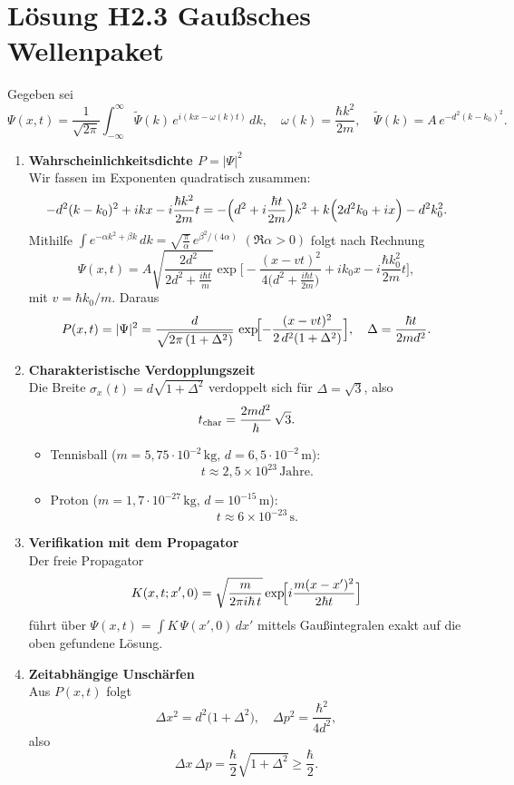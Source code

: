 \documentclass[a4paper,12pt]{article}
\begin{document}
\section*{Lösung H2.3 Gaußsches Wellenpaket}

Gegeben sei
\[
\Psi(x,t)
=\frac{1}{\sqrt{2\pi}}
\int_{-\infty}^{\infty}
\tilde\Psi(k)\,e^{i(kx-\omega(k)t)}\,dk,
\quad
\omega(k)=\frac{\hbar k^2}{2m},
\quad
\tilde\Psi(k)=A\,e^{-d^2(k-k_0)^2}.
\]

\begin{enumerate}[label=(\alph*)]

\item \textbf{Wahrscheinlichkeitsdichte \(P=|\Psi|^2\)}\\
Wir fassen im Exponenten quadratisch zusammen:
\[
-d^2(k-k_0)^2 + i k x - i\frac{\hbar k^2}{2m}t
=
-\Bigl(d^2 + i\frac{\hbar t}{2m}\Bigr)k^2
+ k\Bigl(2d^2k_0 + i x\Bigr)
- d^2k_0^2.
\]
Mithilfe
\(\displaystyle\int e^{-αk^2+βk}\,dk=\sqrt{\frac{\pi}{α}}\,e^{β^2/(4α)}\)
\((\Re α>0)\) folgt nach Rechnung
\[
\Psi(x,t)
=A\sqrt{\frac{2d^2}{2d^2 + \tfrac{i\hbar t}{m}}}
\exp\!\Biggl[
-\frac{(x-vt)^2}{4\bigl(d^2 + \tfrac{i\hbar t}{2m}\bigr)}
+ i k_0 x - i\frac{\hbar k_0^2}{2m}t
\Biggr],
\]
mit \(v=\hbar k_0/m\). Daraus
\[
P(x,t)=|\Psi|^2
=\frac{d}{\sqrt{2\pi\,(1+\Delta^2)}}\,
\exp\!\Bigl[-\frac{(x-vt)^2}{2\,d^2(1+\Delta^2)}\Bigr],
\quad
\Delta=\frac{\hbar t}{2 m d^2}.
\]

\item \textbf{Charakteristische Verdopplungszeit}\\
Die Breite \(\sigma_x(t)=d\sqrt{1+\Delta^2}\) verdoppelt sich für
\(\Delta=\sqrt{3}\), also
\[
t_{\rm char}
=\frac{2m d^2}{\hbar}\,\sqrt{3}.
\]
\begin{itemize}[leftmargin=*]
  \item Tennisball (\(m=5{,}75\cdot10^{-2}\,\mathrm{kg},\,d=6{,}5\cdot10^{-2}\,\mathrm m\)):
  \[
  t\approx2{,}5\times10^{23}\,\mathrm{Jahre}.
  \]
  \item Proton (\(m=1{,}7\cdot10^{-27}\,\mathrm{kg},\,d=10^{-15}\,\mathrm m\)):
  \[
  t\approx6\times10^{-23}\,\mathrm s.
  \]
\end{itemize}

\item \textbf{Verifikation mit dem Propagator}\\
Der freie Propagator
\[
K(x,t;x',0)
=\sqrt{\frac{m}{2\pi i\hbar\,t}}
\exp\!\Bigl[i\frac{m(x-x')^2}{2\hbar t}\Bigr]
\]
führt über
\(\Psi(x,t)=\int K\,\Psi(x',0)\,dx'\)
mittels Gaußintegralen exakt auf die oben gefundene Lösung.

\item \textbf{Zeitabhängige Unschärfen}\\
Aus \(P(x,t)\) folgt
\[
\Delta x^2 = d^2\bigl(1+\Delta^2\bigr),
\quad
\Delta p^2 = \frac{\hbar^2}{4d^2},
\]
also
\[
\Delta x\,\Delta p
=\frac{\hbar}{2}\sqrt{1+\Delta^2}
\ge\frac{\hbar}{2}.
\]
\end{enumerate}
\end{document}
